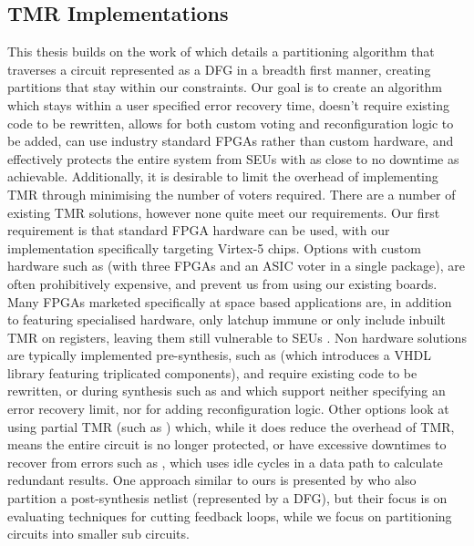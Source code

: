 \documentclass[12pt,final,oneside]{dwThesis} %
\begin{document}
\subsection{\acl{TMR} Implementations}
This thesis builds on the work of\cite{DiesselChange} which details a partitioning algorithm that traverses a circuit represented as a \ac{DFG} in a breadth first manner, creating partitions that stay within our constraints.
Our goal is to create an algorithm which stays within a user specified error recovery time, doesn't require existing code to be rewritten, allows for both custom voting and reconfiguration logic to be added, can use industry standard \acp{FPGA} rather than custom hardware, and effectively protects the entire system from \acp{SEU} with as close to no downtime as achievable.
Additionally, it is desirable to limit the overhead of implementing \ac{TMR} through minimising the number of voters required.
There are a number of existing \ac{TMR} solutions, however none quite meet our requirements.
Our first requirement is that standard \ac{FPGA} hardware can be used, with our implementation specifically targeting Virtex-5 chips. Options with custom hardware such as \cite{VFPGATMR} (with three \acp{FPGA} and an \ac{ASIC} voter in a single package), are often prohibitively expensive, and prevent us from using our existing boards.
Many \acp{FPGA} marketed specifically at space based applications are, in addition to featuring specialised hardware, only latchup immune or only include inbuilt \ac{TMR} on registers, leaving them still vulnerable to \acp{SEU} \cite{FPGAReview}.
Non hardware solutions are typically implemented pre-synthesis, such as \cite{ftmr} (which introduces a \ac{VHDL} library featuring triplicated components), and require existing code to be rewritten, or during synthesis such as \cite{synplify} and \cite{tmrtool} which support neither specifying an error recovery limit, nor for adding reconfiguration logic.
Other options look at using partial \ac{TMR} (such as \cite{partialTMR}) which, while it does reduce the overhead of \ac{TMR}, means the entire circuit is no longer protected, or have excessive downtimes to recover from errors such as \cite{VTMR}, which uses idle cycles in a data path to calculate redundant results.
One approach similar to ours is presented by \cite{PostSynth} who also partition a post-synthesis netlist (represented by a \ac{DFG}), but their focus is on evaluating techniques for cutting feedback loops, while we focus on partitioning circuits into smaller sub circuits.
\end{document}

